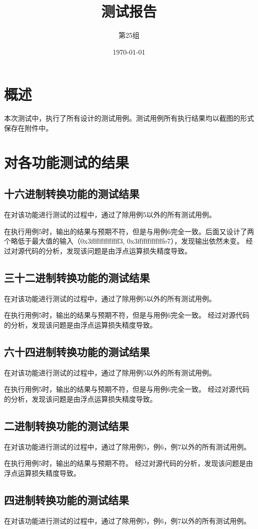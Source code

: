 \documentclass[12pt, a4paper, oneside]{ctexart}
\title{\textbf{测试报告}}
\author{第25组}
\date{\today}
\begin{document}
\maketitle

\section{概述}
本次测试中，执行了所有设计的测试用例。测试用例所有执行结果均以截图的形式保存在附件中。

\section{对各功能测试的结果}
\subsection{十六进制转换功能的测试结果}
在对该功能进行测试的过程中，通过了除用例5以外的所有测试用例。

在执行用例5时，输出的结果与预期不符，但是与用例6完全一致。后面又设计了两个略低于最大值的输入（0x3ffffffffffffff3, 0x3fffffffffffffe7），发现输出依然未变。
经过对源代码的分析，发现该问题是由浮点运算损失精度导致。
\subsection{三十二进制转换功能的测试结果}
在对该功能进行测试的过程中，通过了除用例5以外的所有测试用例。

在执行用例5时，输出的结果与预期不符，但是与用例6完全一致。
经过对源代码的分析，发现该问题是由浮点运算损失精度导致。
\subsection{六十四进制转换功能的测试结果}
在对该功能进行测试的过程中，通过了除用例5以外的所有测试用例。

在执行用例5时，输出的结果与预期不符，但是与用例6完全一致。
经过对源代码的分析，发现该问题是由浮点运算损失精度导致。

\subsection{二进制转换功能的测试结果}
在对该功能进行测试的过程中，通过了除用例5，例6，例7以外的所有测试用例。

在执行用例5时，输出的结果与预期不符。
经过对源代码的分析，发现该问题是由浮点运算损失精度导致。

\subsection{四进制转换功能的测试结果}
在对该功能进行测试的过程中，通过了除用例5，例6，例7以外的所有测试用例。
\end{document}
